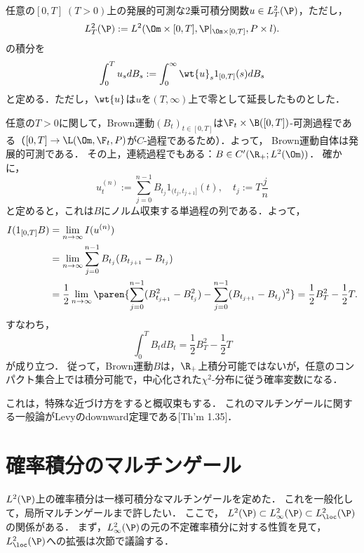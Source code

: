 \documentclass[uplatex,dvipdfmx]{jsreport}
\begin{document}
\begin{definition}[有限区間上の不定積分]
    任意の$[0,T]\;(T>0)$上の発展的可測な2乗可積分関数$u\in L^2_T(\P)$，ただし，
    \[L^2_T(\P):=L^2(\Om\times[0,T],\P|_{\Om\times[0,T]},P\times l).\]
    の積分を
    \[\int^T_0u_sdB_s:=\int^\infty_0\wt{u}_s1_{[0,T]}(s)dB_s\]
    と定める．ただし，$\wt{u}$は$u$を$(T,\infty)$上で零として延長したものとした．
\end{definition}

\begin{example}\label{exp-integral-of-Brownian-motion}
    任意の$T>0$に関して，Brown運動$(B_t)_{t\in[0,T]}$は$\F_t\times\B([0,T])$-可測過程である（$[0,T]\to\L(\Om,\F_t,P)$が$C$-過程であるため）．よって，
    Brown運動自体は発展的可測である．
    その上，連続過程でもある：$B\in C'(\R_+;L^2(\Om))$．
    確かに，
    \[u^{(n)}_t:=\sum^{n-1}_{j=0}B_{t_j}1_{(t_j,t_{j+1}]}(t),\quad t_j:=T\frac{j}{n}\]
    と定めると，これは$B$にノルム収束する単過程の列である．よって，
    \begin{align*}
        I(1_{[0,T]}B)&=\lim_{n\to\infty}I(u^{(n)})\\
        &=\lim_{n\to\infty}\sum^{n-1}_{j=0}B_{t_j}(B_{t_{j+1}}-B_{t_j})\\
        &=\frac{1}{2}\lim_{n\to\infty}\paren{\sum^{n-1}_{j=0}(B_{t_{j+1}}^2-B^2_{t_j})-\sum^{n-1}_{j=0}(B_{t_{j+1}}-B_{t_j})^2}=\frac{1}{2}B_T^2-\frac{1}{2}T.
    \end{align*}
    すなわち，
    \[\int^T_0B_tdB_t=\frac{1}{2}B^2_T-\frac{1}{2}T\]
    が成り立つ．
    従って，Brown運動$B$は，$\R_+$上積分可能ではないが，任意のコンパクト集合上では積分可能で，中心化された$\chi^2$-分布に従う確率変数になる．
\end{example}
\begin{remarks}
    これは，特殊な近づけ方をすると概収束もする．
    これのマルチンゲールに関する一般論がLevyのdownward定理である\cite{Morters-and-Peres}[Th'm 1.35]．
\end{remarks}

\section{確率積分のマルチンゲール}

\begin{tcolorbox}[colframe=ForestGreen, colback=ForestGreen!10!white,breakable,colbacktitle=ForestGreen!40!white,coltitle=black,fonttitle=\bfseries\sffamily,
title=]
    $L^2(\P)$上の確率積分は一様可積分なマルチンゲールを定めた．
    これを一般化して，局所マルチンゲールまで許したい．
    ここで，
    $L^2(\P)\subset L^2_\infty(\P)\subset L^2_\loc(\P)$の関係がある．
    まず，$L^2_\infty(\P)$の元の不定確率積分に対する性質を見て，$L^2_\loc(\P)$への拡張は次節で議論する．
\end{tcolorbox}
\end{document}
